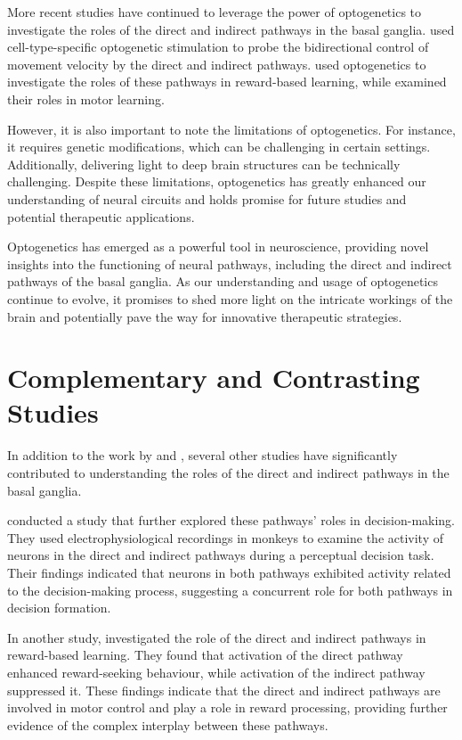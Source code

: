 \documentclass[10pt]{article}
\begin{document}
\begin{sloppypar}
  More recent studies have continued to leverage the power of optogenetics to investigate the roles of the direct and indirect pathways in the basal ganglia. \cite{yttri_opponent_2016} used cell-type-specific optogenetic stimulation to probe the bidirectional control of movement velocity by the direct and indirect pathways. \cite{guillaumin_optogenetic_2020} used optogenetics to investigate the roles of these pathways in reward-based learning, while \cite{hilt_evidence_2016} examined their roles in motor learning.

  However, it is also important to note the limitations of optogenetics. For instance, it requires genetic modifications, which can be challenging in certain settings. Additionally, delivering light to deep brain structures can be technically challenging. Despite these limitations, optogenetics has greatly enhanced our understanding of neural circuits and holds promise for future studies and potential therapeutic applications.

  Optogenetics has emerged as a powerful tool in neuroscience, providing novel insights into the functioning of neural pathways, including the direct and indirect pathways of the basal ganglia. As our understanding and usage of optogenetics continue to evolve, it promises to shed more light on the intricate workings of the brain and potentially pave the way for innovative therapeutic strategies.

  \section{Complementary and Contrasting Studies}
  \label{sec:complementary-and-contrasting-studies}

  In addition to the work by \cite{cui_concurrent_2013} and \cite{kravitz_regulation_2010}, several other studies have significantly contributed to understanding the roles of the direct and indirect pathways in the basal ganglia.

  \cite{yttri_opponent_2016} conducted a study that further explored these pathways’ roles in decision-making. They used electrophysiological recordings in monkeys to examine the activity of neurons in the direct and indirect pathways during a perceptual decision task. Their findings indicated that neurons in both pathways exhibited activity related to the decision-making process, suggesting a concurrent role for both pathways in decision formation.

  In another study, \cite{guillaumin_optogenetic_2020} investigated the role of the direct and indirect pathways in reward-based learning. They found that activation of the direct pathway enhanced reward-seeking behaviour, while activation of the indirect pathway suppressed it. These findings indicate that the direct and indirect pathways are involved in motor control and play a role in reward processing, providing further evidence of the complex interplay between these pathways.


\end{sloppypar}
\end{document}
